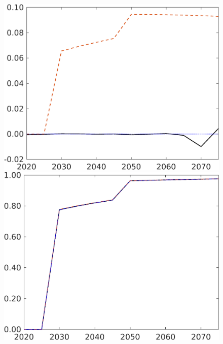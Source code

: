 \begin{figure}[h!!]
\begin{minipage}[]{0.32\textwidth}
	\end{minipage}	
	\begin{minipage}[]{0.32\textwidth}
		\includegraphics[width=1\textwidth]{../../codding_model/own_basedOnFried/optimalPol_190722_tidiedUp/figures/all_July22/taul_CompEffOPT_T_NoTaus_pol4_spillover0_noskill0_sep1_xgrowth1_etaa0.79_lgd0_lff0.png}
	\end{minipage}
	\begin{minipage}[]{0.32\textwidth}
		\includegraphics[width=1\textwidth]{../../codding_model/own_basedOnFried/optimalPol_190722_tidiedUp/figures/all_July22/tauf_CompEffOPT_T_NoTaus_pol4_spillover0_noskill0_sep1_xgrowth1_etaa0.79_lgd0_lff0.png}
	\end{minipage}
\end{figure}

